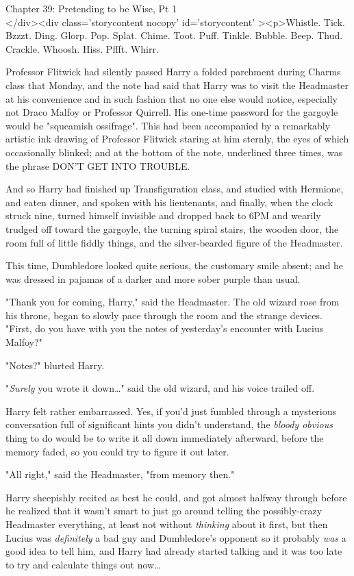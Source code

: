 
Chapter 39: Pretending to be Wise, Pt 1\\
</div><div  class='storycontent nocopy' id='storycontent' ><p>Whistle. Tick. 
Bzzzt. Ding. Glorp. Pop. Splat. Chime. Toot. Puff. Tinkle. Bubble. Beep. Thud. 
Crackle. Whoosh. Hiss. Pffft. Whirr.

Professor Flitwick had silently passed Harry a folded parchment during Charms 
class that Monday, and the note had said that Harry was to visit the Headmaster 
at his convenience and in such fashion that no one else would notice, 
especially not Draco Malfoy or Professor Quirrell. His one-time password for 
the gargoyle would be "squeamish ossifrage". This had been accompanied by a 
remarkably artistic ink drawing of Professor Flitwick staring at him sternly, 
the eyes of which occasionally blinked; and at the bottom of the note, 
underlined three times, was the phrase DON'T GET INTO TROUBLE.

And so Harry had finished up Transfiguration class, and studied with Hermione, 
and eaten dinner, and spoken with his lieutenants, and finally, when the clock 
struck nine, turned himself invisible and dropped back to 6PM and wearily 
trudged off toward the gargoyle, the turning spiral stairs, the wooden door, 
the room full of little fiddly things, and the silver-bearded figure of the 
Headmaster.

This time, Dumbledore looked quite serious, the customary smile absent; and he 
was dressed in pajamas of a darker and more sober purple than usual.

"Thank you for coming, Harry," said the Headmaster. The old wizard rose from 
his throne, began to slowly pace through the room and the strange devices. 
"First, do you have with you the notes of yesterday's encounter with Lucius 
Malfoy?"

"Notes?" blurted Harry.

"\emph{Surely} you wrote it down{\ldots}" said the old wizard, and his voice 
trailed off.

Harry felt rather embarrassed. Yes, if you'd just fumbled through a mysterious 
conversation full of significant hints you didn't understand, the \emph{bloody 
obvious} thing to do would be to write it all down immediately afterward, 
before the memory faded, so you could try to figure it out later.

"All right," said the Headmaster, "from memory then."

Harry sheepishly recited as best he could, and got almost halfway through 
before he realized that it wasn't smart to just go around telling the 
possibly-crazy Headmaster everything, at least not without \emph{thinking} 
about it first, but then Lucius was \emph{definitely} a bad guy and 
Dumbledore's opponent so it probably \emph{was} a good idea to tell him, and 
Harry had already started talking and it was too late to try and calculate 
things out now{\ldots}

